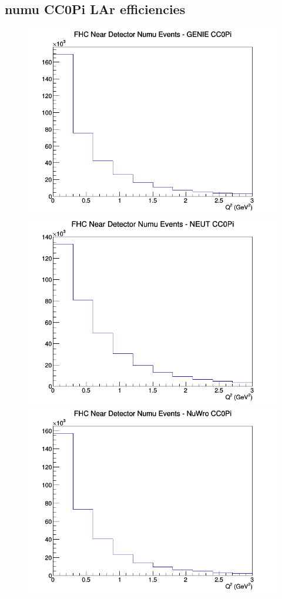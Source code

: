 \documentclass[12pt]{article}
\begin{document}
\subsection{numu CC0Pi LAr efficiencies}
\begin{figure}[h]
\includegraphics[width=\linewidth]{eff_Q2/LAr/CC0Pi_FHC_ND_numu_Q2_GENIE.png}
\endminipage
{}
\includegraphics[width=\linewidth]{eff_Q2/LAr/CC0Pi_FHC_ND_numu_Q2_NEUT.png}
\endminipage
{}
\includegraphics[width=\linewidth]{eff_Q2/LAr/CC0Pi_FHC_ND_numu_Q2_NuWro.png}

\end{figure}
\end{document}
